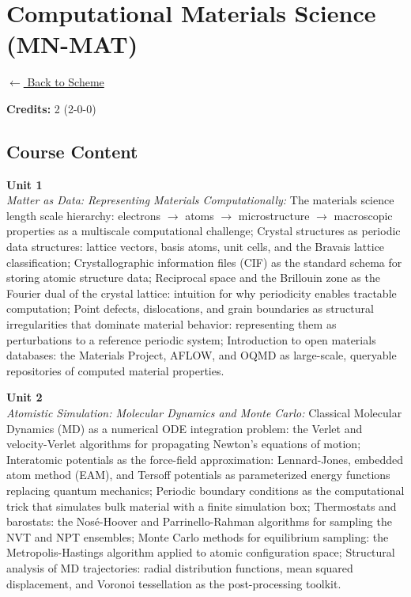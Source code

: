 \section*{Computational Materials Science (MN-MAT)}
\label{minor:MAT_L1}

\noindent \small{\hyperref[main:scheme]{$\leftarrow$ Back to Scheme}} \vspace{0.5cm}

\noindent \textbf{Credits:} 2 (2-0-0)

\subsection*{Course Content}
\noindent\textbf{Unit 1} \\
\textit{Matter as Data: Representing Materials Computationally:} The materials science length scale hierarchy: electrons $\rightarrow$ atoms $\rightarrow$ microstructure $\rightarrow$ macroscopic properties as a multiscale computational challenge; Crystal structures as periodic data structures: lattice vectors, basis atoms, unit cells, and the Bravais lattice classification; Crystallographic information files (CIF) as the standard schema for storing atomic structure data; Reciprocal space and the Brillouin zone as the Fourier dual of the crystal lattice: intuition for why periodicity enables tractable computation; Point defects, dislocations, and grain boundaries as structural irregularities that dominate material behavior: representing them as perturbations to a reference periodic system; Introduction to open materials databases: the Materials Project, AFLOW, and OQMD as large-scale, queryable repositories of computed material properties.

\vspace{0.3cm}

\noindent\textbf{Unit 2} \\
\textit{Atomistic Simulation: Molecular Dynamics and Monte Carlo:} Classical Molecular Dynamics (MD) as a numerical ODE integration problem: the Verlet and velocity-Verlet algorithms for propagating Newton's equations of motion; Interatomic potentials as the force-field approximation: Lennard-Jones, embedded atom method (EAM), and Tersoff potentials as parameterized energy functions replacing quantum mechanics; Periodic boundary conditions as the computational trick that simulates bulk material with a finite simulation box; Thermostats and barostats: the Nosé-Hoover and Parrinello-Rahman algorithms for sampling the NVT and NPT ensembles; Monte Carlo methods for equilibrium sampling: the Metropolis-Hastings algorithm applied to atomic configuration space; Structural analysis of MD trajectories: radial distribution functions, mean squared displacement, and Voronoi tessellation as the post-processing toolkit.

